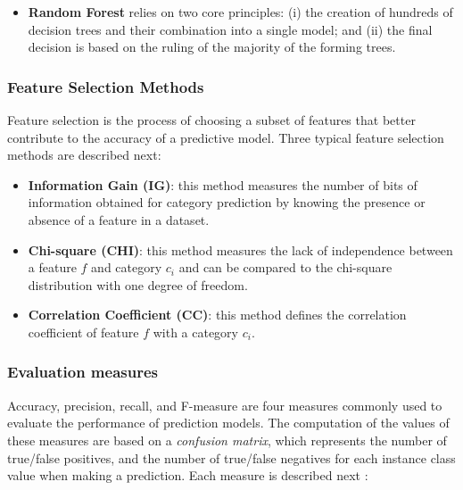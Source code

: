 \begin{itemize}
  \item \textbf{Random Forest}\cite{Breiman:2001} relies on two core principles: (i) the creation of hundreds of decision trees and their combination into a single model; and (ii) the final decision is based on the ruling of the majority of the forming trees. 
\end{itemize}

\subsubsection{Feature Selection Methods}
Feature selection is the process of choosing a subset of features that better contribute to the accuracy of a predictive model. Three typical feature selection methods are described next\cite{Zheng:2004}:

\begin{itemize}
  \item \textbf{Information Gain (IG)}:  this method measures the number of bits of information obtained for category prediction by knowing the presence or absence of a feature in a dataset.
  \item \textbf{Chi-square (CHI)}: this method measures the lack of independence between a feature $f$ and category $c_i$ and can be compared to the chi-square distribution with one degree of freedom.
  \item \textbf{Correlation Coefficient (CC)}:  this method defines the correlation coefficient of feature $f$ with a category $c_i$.    
\end{itemize}

\subsubsection{Evaluation measures}
Accuracy, precision, recall, and F-measure are four measures commonly used to evaluate the performance of prediction models\cite{Feldman:2006}. The computation of the values of these measures are based on a \textit{confusion matrix}\cite{Williams:2011}, which represents the number of true/false positives, and the number of true/false negatives for each instance class value when making a prediction. Each measure is described next \cite{Japkowicz:2011}: 

